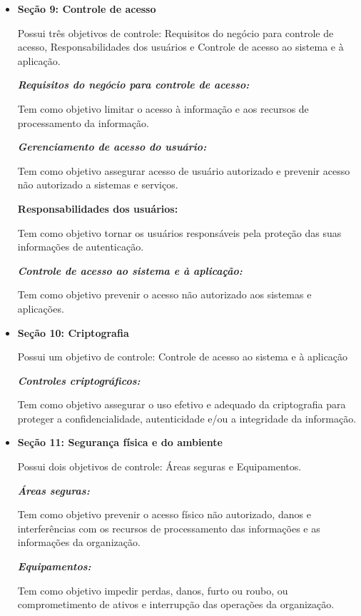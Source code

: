 \begin{itemize}
    \item  \textbf{Seção 9: Controle de acesso}
    
    Possui três objetivos de controle: Requisitos do negócio para controle de acesso, Responsabilidades dos usuários e  Controle de acesso ao sistema e à aplicação.
    
    \textit{\textbf{Requisitos do negócio para controle de acesso:}}
    
    Tem como objetivo limitar o acesso à informação e aos recursos de processamento da informação.
    
  \textit{  \textbf{Gerenciamento de acesso do usuário:}}
    
    Tem como objetivo assegurar acesso de usuário autorizado e prevenir acesso não autorizado a sistemas e serviços.
    
    \textbf{Responsabilidades dos usuários:} 
   
    Tem como objetivo tornar os usuários responsáveis pela proteção das suas informações de autenticação.
    
    \textit{\textbf{Controle de acesso ao sistema e à aplicação:} }
    
    Tem como objetivo prevenir o acesso não autorizado aos sistemas e aplicações.
\end{itemize}
\begin{itemize}
    \item \textbf{Seção 10: Criptografia}
    
    Possui um objetivo de controle: Controle de acesso ao sistema e à aplicação
    
    \textit{\textbf{Controles criptográficos: } }
    
    Tem como objetivo assegurar o uso efetivo e adequado da criptografia para proteger a confidencialidade, autenticidade e/ou a integridade da informação.
\end{itemize}
\begin{itemize}
    \item \textbf{Seção 11: Segurança física e do ambiente}
    
    Possui dois objetivos de controle: Áreas seguras e Equipamentos.
    
    \textit{\textbf{Áreas seguras:}}
    
    Tem como objetivo prevenir o acesso físico não autorizado, danos e interferências com os recursos de processamento das informações e as informações da organização. 
    
   \textit{ \textbf{Equipamentos:} }
    
    Tem como objetivo impedir perdas, danos, furto ou roubo, ou comprometimento de ativos e interrupção
das operações da organização.
\end{itemize}
